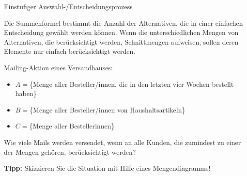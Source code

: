 \documentclass[12pt,ngerman,a4paper,ignorenonframetext,]{beamer}
\providecommand{\tightlist}{%
  \setlength{\itemsep}{0pt}\setlength{\parskip}{0pt}}
\begin{document}
\begin{frame}{Einstufiger Auswahl-/Entscheidungsprozess}
\protect\hypertarget{einstufiger-auswahl-entscheidungsprozess}{}

\small

Die Summenformel bestimmt die Anzahl der Alternativen, die in einer
einfachen Entscheidung gewählt werden können. Wenn die unterschiedlichen
Mengen von Alternativen, die berücksichtigt werden, Schnittmengen
aufweisen, sollen deren Elemente nur einfach berücksichtigt werden.


\begin{Uebung}[Übung]

Mailing-Aktion eines Versandhauses:

\begin{itemize}
\tightlist
\item
  \(A=\)\{Menge aller Besteller/innen, die in den letzten vier Wochen
  bestellt haben\}
\item
  \(B=\)\{Menge aller Besteller/innen von Haushaltsartikeln\}
\item
  \(C=\)\{Menge aller Bestellerinnen\}
\end{itemize}

Wie viele Mails werden versendet, wenn an alle Kunden, die zumindest zu
einer der Mengen gehören, berücksichtigt werden?

\textbf{Tipp:} Skizzieren Sie die Situation mit Hilfe eines
Mengendiagramms!

\end{Uebung}

\end{frame}
\end{document}
